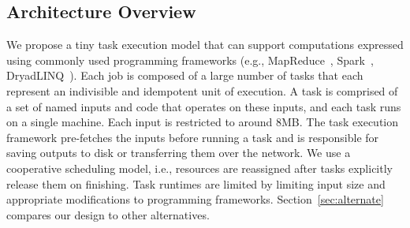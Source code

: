 \subsection{Architecture Overview}
We propose a tiny task execution model that can support computations expressed using 
commonly used programming frameworks (e.g., MapReduce~\cite{dean2008mapreduce},
Spark~\cite{zaharia2010spark}, DryadLINQ~\cite{yu2008dryadlinq}). 
Each job is composed of a large number of tasks that each represent an indivisible
and idempotent unit of execution. A task is comprised of a set of named inputs
and code that operates on these inputs, and each task runs on a single machine.
Each input is restricted to around 8MB. The task execution framework
pre-fetches the inputs before running a task and is responsible for saving
outputs to disk or transferring them over the network.  We use a cooperative 
scheduling model, i.e., resources are reassigned after tasks explicitly release 
them on finishing. Task runtimes are limited by limiting input size and
appropriate modifications to programming frameworks. Section~\ref{sec:alternate} 
compares our design to other alternatives.


